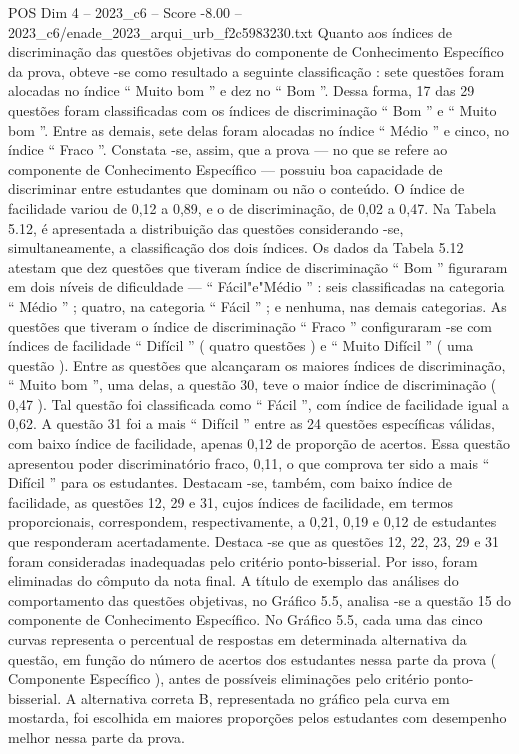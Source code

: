 \begin{textsample}{POS Dim 4 – 2023\_c6 – Score -8.00 – 2023\_c6/enade\_2023\_arqui\_urb\_f2c5983230.txt}
Quanto aos índices de discriminação das questões objetivas do componente de Conhecimento Específico da prova, obteve -se como resultado a seguinte classificação : sete questões foram alocadas no índice “ Muito bom ” e dez no “ Bom ”.
Dessa forma, 17 das 29 questões foram classificadas com os índices de discriminação “ Bom ” e “ Muito bom ”.
Entre as demais, sete delas foram alocadas no índice “ Médio ” e cinco, no índice “ Fraco ”.
Constata -se, assim, que a prova — no que se refere ao componente de Conhecimento Específico — possuiu boa capacidade de discriminar entre estudantes que dominam ou não o conteúdo.
O índice de facilidade variou de 0,12 a 0,89, e o de discriminação, de 0,02 a 0,47.
Na Tabela 5.12, é apresentada a distribuição das questões considerando -se, simultaneamente, a classificação dos dois índices.
Os dados da Tabela 5.12 atestam que dez questões que tiveram índice de discriminação “ Bom ” figuraram em dois níveis de dificuldade — “ Fácil"e"Médio ” : seis classificadas na categoria “ Médio ” ; quatro, na categoria “ Fácil ” ; e nenhuma, nas demais categorias.
As questões que tiveram o índice de discriminação “ Fraco ” configuraram -se com índices de facilidade “ Difícil ” ( quatro questões ) e “ Muito Difícil ” ( uma questão ).
Entre as questões que alcançaram os maiores índices de discriminação, “ Muito bom ”, uma delas, a questão 30, teve o maior índice de discriminação ( 0,47 ).
Tal questão foi classificada como “ Fácil ”, com índice de facilidade igual a 0,62.
A questão 31 foi a mais “ Difícil ” entre as 24 questões específicas válidas, com baixo índice de facilidade, apenas 0,12 de proporção de acertos.
Essa questão apresentou poder discriminatório fraco, 0,11, o que comprova ter sido a mais “ Difícil ” para os estudantes.
Destacam -se, também, com baixo índice de facilidade, as questões 12, 29 e 31, cujos índices de facilidade, em termos proporcionais, correspondem, respectivamente, a 0,21, 0,19 e 0,12 de estudantes que responderam acertadamente.
Destaca -se que as questões 12, 22, 23, 29 e 31 foram consideradas inadequadas pelo critério ponto-bisserial.
Por isso, foram eliminadas do cômputo da nota final.
A título de exemplo das análises do comportamento das questões objetivas, no Gráfico 5.5, analisa -se a questão 15 do componente de Conhecimento Específico.
No Gráfico 5.5, cada uma das cinco curvas representa o percentual de respostas em determinada alternativa da questão, em função do número de acertos dos estudantes nessa parte da prova ( Componente Específico ), antes de possíveis eliminações pelo critério ponto-bisserial.
A alternativa correta B, representada no gráfico pela curva em mostarda, foi escolhida em maiores proporções pelos estudantes com desempenho melhor nessa parte da prova.

\end{textsample}
